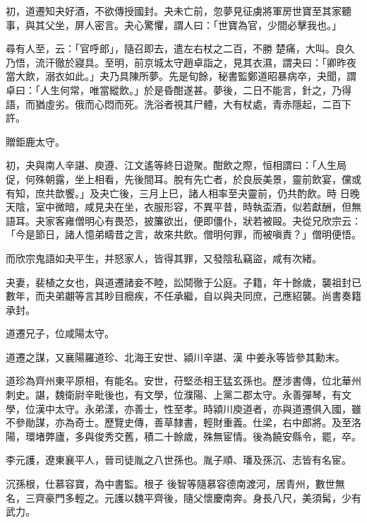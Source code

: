 \begin{pinyinscope}
 初，道遷知夬好酒，不欲傳授國封。夬未亡前，忽夢見征虜將軍房世寶至其家聽事，與其父坐，屏人密言。夬心驚懼，謂人曰：「世寶為官，少間必擊我也。」



 尋有人至，云：「官呼郎」，隨召即去，遣左右杖之二百，不勝
 楚痛，大叫。良久乃悟，流汗徹於寢具。至明，前京城太守趙卓詣之，見其衣濕，謂夬曰：「卿昨夜當大飲，溺衣如此。」夬乃具陳所夢。先是旬餘，秘書監鄭道昭暴病卒，夬聞，謂卓曰：「人生何常，唯當縱飲。」於是昏酣遂甚。夢後，二日不能言，針之，乃得語，而猶虛劣。俄而心悶而死。洗浴者視其尸體，大有杖處，青赤隱起，二百下許。



 贈鉅鹿太守。



 初，夬與南人辛諶、庾遵、江文遙等終日遊聚。酣飲之際，恒相謂曰：「人生局促，何殊朝露，坐上相看，先後間耳。脫有先亡者，於良辰美景，靈前飲宴，儻或有知，庶共歆饗。」及夬亡後，三月上巳，諸人相率至夬靈前，仍共酌飲。時
 日晚天陰，室中微暗，咸見夬在坐，衣服形容，不異平昔，時執盃酒，似若獻酬，但無語耳。夬家客雍僧明心有畏恐，披簾欲出，便即僵仆，狀若被毆。夬從兄欣宗云：「今是節日，諸人憶弟疇昔之言，故來共飲。僧明何罪，而被嗔責？」僧明便悟。



 而欣宗鬼語如夬平生，并怒家人，皆得其罪，又發陰私竊盜，咸有次緒。



 夬妻，裴植之女也，與道遷諸妾不睦，訟鬩徹于公庭。子籍，年十餘歲，襲祖封已數年，而夬弟翽等言其眇目癇疾，不任承繼，自以與夬同庶，己應紹襲。尚書奏籍承封。



 道遷兄子，位咸陽太守。



 道遷之謀，又襄陽羅道珍、北海王安世、潁川辛諶、漢
 中姜永等皆參其勳末。



 道珍為齊州東平原相，有能名。安世，苻堅丞相王猛玄孫也。歷涉書傳，位北華州刺史。諶，魏衛尉辛毗後也，有文學，位濮陽、上黨二郡太守。永善彈琴，有文學，位漢中太守。永弟漾，亦善士，性至孝。時潁川庾道者，亦與道遷俱入國，雖不參勛謀，亦為奇士。歷覽史傳，善草隸書，輕財重義。仕梁，右中郎將。及至洛陽，環堵弊廬，多與俊秀交舊，積二十餘歲，殊無宦情。後為饒安縣令，罷，卒。



 李元護，遼東襄平人，晉司徒胤之八世孫也。胤子順、璠及孫沉、志皆有名宦。



 沉孫根，仕慕容寶，為中書監。根子
 後智等隨慕容德南渡河，居青州，數世無名，三齊豪門多輕之。元護以魏平齊後，隨父懷慶南奔。身長八尺，美須髯，少有武力。




\end{pinyinscope}
